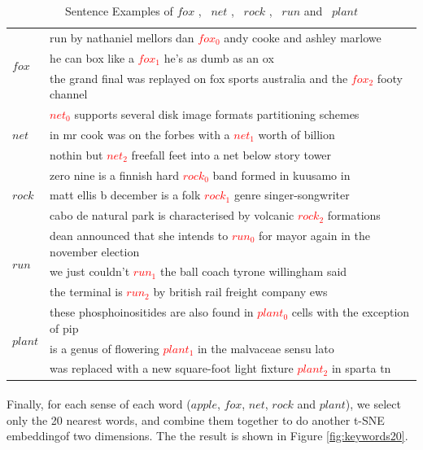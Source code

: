 \begin{table}[tb]
\caption{Sentence Examples of $fox$ , \ $net$ , \ $rock$ , \ $run$ and \ $plant$ } \label{tab:sentenceother} 
\begin{center} 
\begin{tabular}{|l|l|}
\hline
\multirow{3}{*}{$fox$} 
&run by nathaniel mellors dan \textcolor{red}{$fox_0$} andy cooke and ashley marlowe\\
&he can box like a \textcolor{red}{$fox_1$} he's as dumb as an ox\\
&the grand final was replayed on fox sports australia and the \textcolor{red}{$fox_2$} footy channel\\
\hline
\multirow{3}{*}{$net$} 
&\textcolor{red}{$net_0$} supports several disk image formats partitioning schemes\\
&in mr cook was on the forbes with a \textcolor{red}{$net_1$} worth of billion \\
&nothin but \textcolor{red}{$net_2$} freefall feet into a net below story tower\\
\hline
\multirow{3}{*}{$rock$} 
&zero nine is a finnish hard \textcolor{red}{$rock_0$} band formed in kuusamo in\\
&matt ellis b december is a folk \textcolor{red}{$rock_1$} genre singer-songwriter\\
&cabo de natural park is characterised by volcanic \textcolor{red}{$rock_2$} formations\\
\hline
\multirow{3}{*}{$run$} 
&dean announced that she intends to \textcolor{red}{$run_0$} for mayor again in the november election\\
& we just couldn't \textcolor{red}{$run_1$} the ball coach tyrone willingham said\\
& the terminal is \textcolor{red}{$run_2$} by british rail freight company ews\\
\hline
\multirow{3}{*}{$plant$} 
&these phosphoinositides are also found in \textcolor{red}{$plant_0$} cells with the exception of pip\\
&is a genus of flowering \textcolor{red}{$plant_1$} in the malvaceae sensu lato\\
&was replaced with a new square-foot light fixture \textcolor{red}{$plant_2$} in sparta tn\\
\hline
\end{tabular} 
\end{center}
\end{table}


\paragraph{} Finally, for each sense of each word ($apple$, $fox$, $net$, $rock$ and $plant$), we select only the 20 nearest words, and combine them together to do another t-SNE embeddingof  two dimensions. The the result is shown in Figure \ref{fig:keywords20}. 

